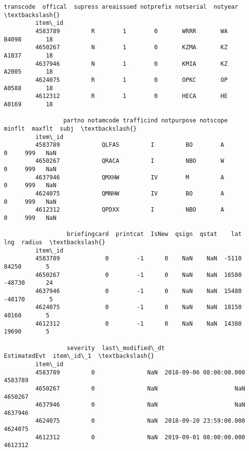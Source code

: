 \documentclass[11pt]{article}
\begin{document}
\begin{Verbatim}[commandchars=\\\{\}]
                 transcode  offical  supress areaissued notprefix notserial  notyear  \textbackslash{}
         item\_id                                                                       
         4583789         R        1        0       WRRR       WA      B4098       18   
         4650267         N        1        0       KZMA       KZ      A1037       18   
         4637946         N        1        0       KMIA       KZ      A2005       18   
         4624075         R        1        0       OPKC       OP      A0588       18   
         4612312         R        1        0       HECA       HE      A0169       18   
         
                 partno notamcode trafficind notpurpose notscope  minflt  maxflt  subj  \textbackslash{}
         item\_id                                                                         
         4583789            QLFAS         I         BO        A        0     999   NaN   
         4650267            QRACA         I         NBO       W        0     999   NaN   
         4637946            QMXHW         IV        M         A        0     999   NaN   
         4624075            QMNHW         IV        BO        A        0     999   NaN   
         4612312            QPDXX         I         NBO       A        0     999   NaN   
         
                  briefingcard  printcat  IsNew  qsign  qstat    lat    lng  radius  \textbackslash{}
         item\_id                                                                      
         4583789             0        -1      0    NaN    NaN  -5110  84250       5   
         4650267             0        -1      0    NaN    NaN  16580 -48730      24   
         4637946             0        -1      0    NaN    NaN  15480 -48170       5   
         4624075             0        -1      0    NaN    NaN  18150  40160       5   
         4612312             0        -1      0    NaN    NaN  14380  19690       5   
         
                  severity  last\_modified\_dt             EstimatedEvt  item\_id\_1  \textbackslash{}
         item\_id                                                                   
         4583789         0               NaN  2018-09-06 08:00:00.000    4583789   
         4650267         0               NaN                      NaN    4650267   
         4637946         0               NaN                      NaN    4637946   
         4624075         0               NaN  2018-09-20 23:59:00.000    4624075   
         4612312         0               NaN  2019-09-01 08:00:00.000    4612312   
         

\end{Verbatim}
\end{document}
